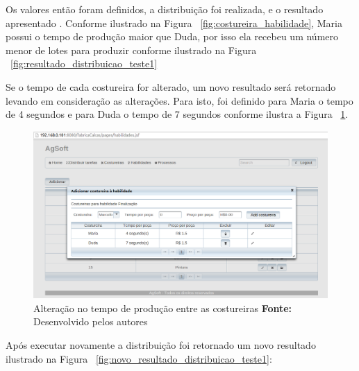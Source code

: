\par Os valores então foram definidos, a distribuição foi realizada, e o resultado apresentado
. Conforme ilustrado na Figura ~\ref{fig:costureira_habilidade}, Maria possui
o tempo de produção maior que Duda, por isso ela recebeu um número menor de lotes
para produzir conforme ilustrado na Figura ~\ref{fig:resultado_distribuicao_teste1}

\par Se o tempo de cada costureira for alterado, um novo resultado será
retornado levando em consideração as alterações. Para isto, foi definido para
Maria o tempo de 4 segundos e para Duda o tempo de 7 segundos conforme ilustra a
Figura ~\ref{fig:tempo_costureiras}. 

\newpage

\begin{figure}[h!]
	\centerline{\includegraphics[scale=0.4]{./imagens/alterando_tempo_costureira.png}}
	\caption[Alteração no tempo de produção entre as costureiras]
	{Alteração no tempo de produção entre as costureiras \textbf{Fonte:} Desenvolvido pelos autores}
	\label{fig:tempo_costureiras}
\end{figure}

\par Após executar novamente a distribuição foi retornado um novo resultado
ilustrado na Figura ~\ref{fig:novo_resultado_distribuicao_teste1}:


